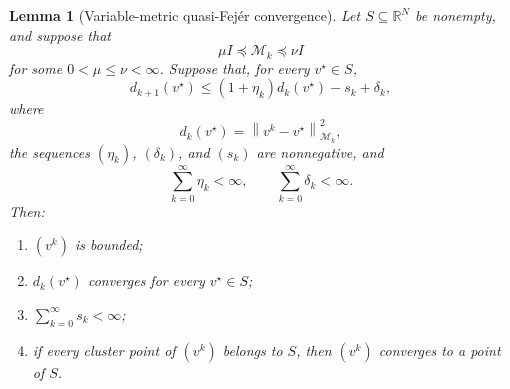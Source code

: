 \documentclass[a4paper,11pt]{book}
\theoremstyle{plain}
\newtheorem{lemma}[theorem]{Lemma}
\theoremstyle{definition}
\theoremstyle{remark}
\numberwithin{equation}{chapter}
\numberwithin{algorithm}{chapter}
\newcommand{\R}{\mathbb{R}}
\newcommand{\norm}[1]{\left\|#1\right\|}
\begin{document}
	\begin{lemma}[Variable-metric quasi-Fejér convergence]
		Let \(S\subseteq\R^N\) be nonempty, and suppose that
		\[
		\mu I\preceq\mathcal M_k\preceq\nu I
		\]
		for some \(0<\mu\leq\nu<\infty\). Suppose that, for every
		\(v^\star\in S\),
		\begin{equation}
			d_{k+1}(v^\star)
			\leq
			(1+\eta_k)d_k(v^\star)-s_k+\delta_k,
			\label{eq:quasi-fejer-descent}
		\end{equation}
		where
		\[
		d_k(v^\star)
		=
		\norm{v^k-v^\star}_{\mathcal M_k}^2,
		\]
		the sequences \((\eta_k)\), \((\delta_k)\), and \((s_k)\) are nonnegative,
		and
		\[
		\sum_{k=0}^{\infty}\eta_k<\infty,
		\qquad
		\sum_{k=0}^{\infty}\delta_k<\infty.
		\]
		Then:
		
		\begin{enumerate}
			\item \((v^k)\) is bounded;
			\item \(d_k(v^\star)\) converges for every \(v^\star\in S\);
			\item \(\sum_{k=0}^{\infty}s_k<\infty\);
			\item if every cluster point of \((v^k)\) belongs to \(S\), then
			\((v^k)\) converges to a point of \(S\).
		\end{enumerate}
	\end{lemma}
	
\end{document}
